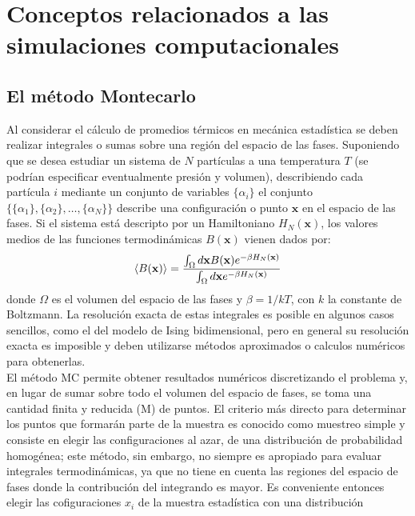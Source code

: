 
\section{Conceptos relacionados a las simulaciones computacionales}
\label{sec:simulations}
\subsection{El m\'etodo Montecarlo}

Al considerar el c\'alculo de promedios t\'ermicos en mecánica estadística se deben realizar integrales o sumas sobre
 una región del espacio de las fases.
Suponiendo que se desea estudiar un sistema de $N$ partículas a una temperatura $T$ (se podrían especificar eventualmente presión y volumen),
 describiendo cada partícula $i$ mediante un conjunto de variables $\{\alpha_i \}$ el conjunto $\{\{\alpha_1\},\{\alpha_2\},\dots,\{\alpha_N\}\}$
 describe una configuración o punto $\mathbf{x}$ en el espacio de las fases. Si el sistema está descripto por un Hamiltoniano
 $H_N(\mathbf{x})$, los valores medios de las funciones termodinámicas $B(\mathbf{x})$ vienen dados por:
\\
\begin{equation}
\mean{B(\mathbf{x})}=\frac{\int_{\Omega}{d\mathbf{x}B(\mathbf{x})e^{-\beta H_N(\mathbf{x})}}}{\int_{\Omega}{d\mathbf{x}e^{-\beta H_N(\mathbf{x})}}}
\label{vmB}
\end{equation}
 donde $\Omega$ es el volumen del espacio de las fases y $\beta=1/kT$, con $k$ la constante de Boltzmann. La resolución exacta de estas integrales es posible
 en algunos casos sencillos, como el del modelo de Ising bidimensional, pero en general su resoluci\'on exacta es imposible
 y deben utilizarse métodos aproximados o calculos numéricos para obtenerlas.\\
El método MC permite obtener resultados numéricos discretizando el problema y, en lugar de sumar sobre todo el volumen del espacio de fases,
 se toma una cantidad finita y reducida (M) de puntos.
 El criterio más directo para determinar los puntos que formarán parte de la muestra es conocido como muestreo simple y consiste en elegir las configuraciones al azar,
 de una distribuci\'on de probabilidad homog\'enea;
 este método, sin embargo, no siempre es apropiado para evaluar integrales termodinámicas, ya que no tiene en cuenta las regiones del espacio de fases
 donde la contribución del integrando es mayor. Es conveniente entonces elegir las cofiguraciones $x_{i}$ de la muestra estadística con una distribución
